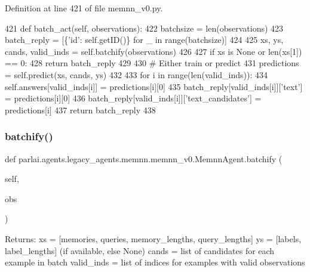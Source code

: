 Definition at line 421 of file memnn\+\_\+v0.\+py.


\begin{DoxyCode}
421     \textcolor{keyword}{def }batch\_act(self, observations):
422         batchsize = len(observations)
423         batch\_reply = [\{\textcolor{stringliteral}{'id'}: self.getID()\} \textcolor{keywordflow}{for} \_ \textcolor{keywordflow}{in} range(batchsize)]
424 
425         xs, ys, cands, valid\_inds = self.batchify(observations)
426 
427         \textcolor{keywordflow}{if} xs \textcolor{keywordflow}{is} \textcolor{keywordtype}{None} \textcolor{keywordflow}{or} len(xs[1]) == 0:
428             \textcolor{keywordflow}{return} batch\_reply
429 
430         \textcolor{comment}{# Either train or predict}
431         predictions = self.predict(xs, cands, ys)
432 
433         \textcolor{keywordflow}{for} i \textcolor{keywordflow}{in} range(len(valid\_inds)):
434             self.answers[valid\_inds[i]] = predictions[i][0]
435             batch\_reply[valid\_inds[i]][\textcolor{stringliteral}{'text'}] = predictions[i][0]
436             batch\_reply[valid\_inds[i]][\textcolor{stringliteral}{'text\_candidates'}] = predictions[i]
437         \textcolor{keywordflow}{return} batch\_reply
438 
\end{DoxyCode}
\mbox{\label{classparlai_1_1agents_1_1legacy__agents_1_1memnn_1_1memnn__v0_1_1MemnnAgent_afaa379fa31bcc83bd467d15e2976d0a3}} 
\subsubsection{\texorpdfstring{batchify()}{batchify()}}
{\footnotesize\ttfamily def parlai.\+agents.\+legacy\+\_\+agents.\+memnn.\+memnn\+\_\+v0.\+Memnn\+Agent.\+batchify (\begin{DoxyParamCaption}\item[{}]{self,  }\item[{}]{obs }\end{DoxyParamCaption})}

\begin{DoxyVerb}Returns:
    xs = [memories, queries, memory_lengths, query_lengths]
    ys = [labels, label_lengths] (if available, else None)
    cands = list of candidates for each example in batch
    valid_inds = list of indices for examples with valid observations
\end{DoxyVerb}
 

